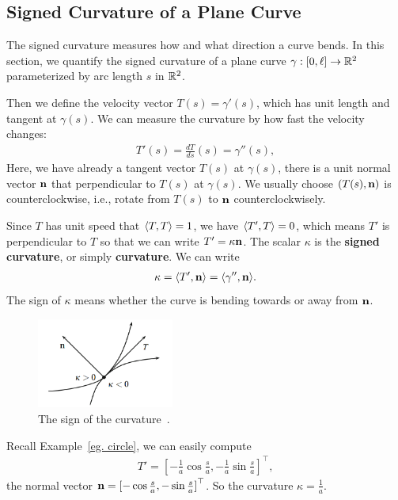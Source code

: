 \subsection{Signed Curvature of a Plane Curve}
The signed curvature measures how and what direction a curve bends. In this section, we quantify the signed curvature
of a plane curve $\gamma: [0, \ell] \rightarrow {\mathbb{R}}^2$ parameterized by arc length $s$ in ${\mathbb{R}}^2$.

Then we define the velocity vector $T(s)=\gamma'(s)$, which has unit length and tangent at $\gamma(s)$.
We can measure the curvature by how fast the velocity changes:
\begin{align}
    T'(s)=\frac{dT}{ds}(s)=\gamma''(s), \nonumber
\end{align}
Here, we have already
a tangent vector $T(s)$ at $\gamma(s)$, there is a unit normal vector ${\mathbf{n}}$ that perpendicular to $T(s)$ at $\gamma(s)$.
We usually choose $(T(s), {\mathbf{n}})$ is counterclockwise, i.e., rotate from $T(s)$ to ${\mathbf{n}}$ counterclockwisely.

Since $T$ has unit speed that $\langle T, T \rangle=1$, we have $\langle T', T \rangle=0$, which means $T'$ is perpendicular to
$T$ so that we can write $T'=\kappa{\mathbf{n}}$. The scalar $\kappa$ is the \textbf{signed curvature}, or simply \textbf{curvature}.
We can write
\begin{align}
    \kappa = \langle T', {\mathbf{n}} \rangle=\langle \gamma'', {\mathbf{n}} \rangle.
\end{align}
The sign of $\kappa$ means whether the curve is bending towards or away from ${\mathbf{n}}$.
\begin{figure}[htb]
    \centering
    \includegraphics[width=0.4\textwidth]{../Lectures/Figures/curvature.png}
    \caption{The sign of the curvature~\cite[p.~12]{tuDifferentialGeometry2017}.}
\end{figure}
\begin{example}
    Recall Example~\ref{eg. circle}, we can easily compute 
    \begin{align}
        T'=[-\frac{1}{a}\cos\frac{s}{a}, -\frac{1}{a}\sin\frac{s}{a}]^\top, \nonumber
    \end{align}
    the normal vector ${\mathbf{n}}={[-\cos\frac{s}{a}, -\sin\frac{s}{a}]}^\top$.
    So the curvature $\kappa=\frac{1}{a}$.
\end{example}

